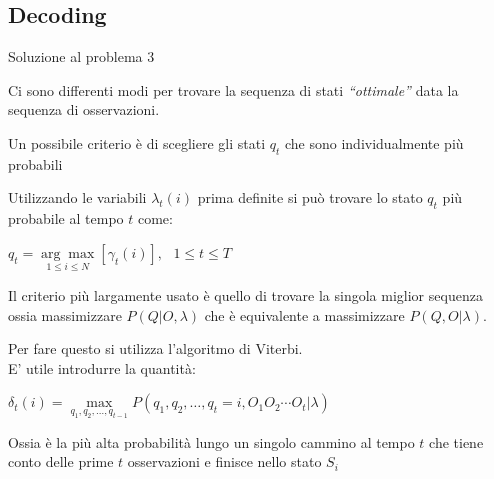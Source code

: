 \documentclass[slidestop,mathserif,red]{beamer}
\begin{document}
\subsection{Decoding}
\begin{frame}{Soluzione al problema 3}
\begin{block}{}
Ci sono differenti modi per trovare la sequenza di stati \textit{``ottimale''} data la sequenza di osservazioni.
\end{block}

\begin{block}{}
Un possibile criterio \`e di scegliere gli stati $q_{t}$ che sono individualmente pi\`u probabili 
\end{block}

\begin{block}{}
Utilizzando le variabili $\lambda_{t}(i)$ prima definite si pu\`o trovare lo stato $q_{t}$ pi\`u probabile al tempo $t$ come:
\begin{center}
	$q_{t}=\underset{1 \leq i \leq N}{\arg\max}[\gamma_{t}(i)],\ \ \ 1\leq t \leq T$
\end{center}
\end{block}

\end{frame}


\begin{frame}
\begin{block}{}
Il criterio pi\`u largamente usato \`e quello di trovare la singola miglior sequenza ossia massimizzare $P(Q|O,\lambda)$ che \`e equivalente a massimizzare $P(Q,O|\lambda)$.
\end{block}

\begin{block}{}
Per fare questo si utilizza l'algoritmo di Viterbi.\\
E' utile introdurre la quantit\`a: 
\begin{center}
$\delta_{t}(i) = \underset{q_{1},q_{2},\ldots,q_{t-1}}{\max}P(q_{1},q_{2},\ldots,q_{t}=i,O_{1}O_{2}\cdots O_{t}|\lambda)$
\end{center}
Ossia \`e la pi\`u alta probabilit\`a lungo un singolo cammino al tempo $t$ che tiene conto delle prime $t$ osservazioni e finisce nello stato $S_{i}$
\end{block}

\end{frame}
\end{document}
